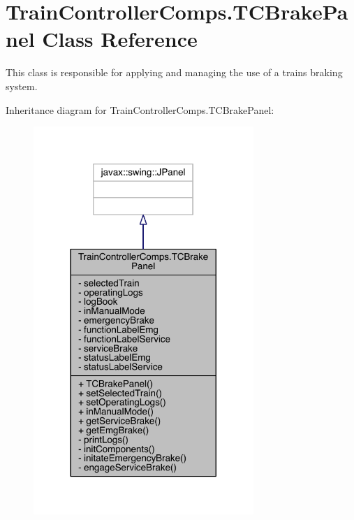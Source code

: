 \hypertarget{classTrainControllerComps_1_1TCBrakePanel}{}\section{Train\+Controller\+Comps.\+T\+C\+Brake\+Panel Class Reference}
\label{classTrainControllerComps_1_1TCBrakePanel}


This class is responsible for applying and managing the use of a train\textquotesingle{}s braking system.  




Inheritance diagram for Train\+Controller\+Comps.\+T\+C\+Brake\+Panel\+:
\nopagebreak
\begin{figure}[H]
\begin{center}
\leavevmode
\includegraphics[width=236pt]{classTrainControllerComps_1_1TCBrakePanel__inherit__graph}
\end{center}
\end{figure}


